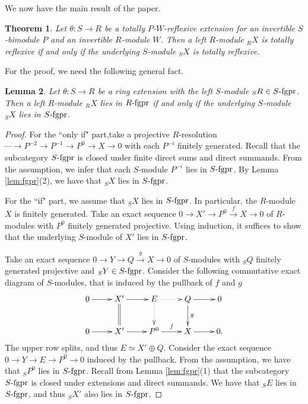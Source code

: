 \documentclass[a4paper]{amsart}
\newtheorem{thm}{Theorem}[section]
\newtheorem{lem}[thm]{Lemma}
\theoremstyle{definition}
\theoremstyle{remark}
\numberwithin{equation}{section}
\begin{document}
We now have the main result of the paper.

\begin{thm}\label{thm:1}
Let $\theta\colon S\rightarrow R$ be a totally $P$-$W$-reflexive extension for  an invertible $S$-bimodule $P$ and an invertible $R$-module $W$. Then a left $R$-module $_RX$ is totally reflexive if and only if the underlying $S$-module $_SX$ is totally reflexive.
\end{thm}

For the proof, we need the following general fact.

\begin{lem}\label{lem:fgpr2}
Let $\theta\colon S\rightarrow R$ be a ring extension with the left $S$-module $_SR\in S\mbox{-{\rm fgpr}}$. Then a left $R$-module $_RX$ lies in $R\mbox{-{\rm fgpr}}$ if and only if the underlying $S$-module $_SX$ lies in $S\mbox{-{\rm fgpr}}$.
\end{lem}

\begin{proof}
For the ``only if" part,take a projective $R$-resolution $\cdots \rightarrow P^{-2}\rightarrow P^{-1}\rightarrow P^0\rightarrow X\rightarrow 0$ with each $P^{-i}$ finitely generated. Recall that the subcategory $S\mbox{-{\rm fgpr}}$ is closed under finite direct sums and direct summands. From the assumption, we infer that each  $S$-module $P^{-i}$ lies in $S\mbox{-{\rm fgpr}}$. By Lemma \ref{lem:fgpr}(2), we have that  $_SX$ lies in $S\mbox{-{\rm fgpr}}$.

For the ``if" part, we assume that $_SX$ lies in $S\mbox{-{\rm fgpr}}$. In particular, the $R$-module $X$ is finitely generated.
Take an exact sequence $0\rightarrow X'\rightarrow P^0\stackrel{f}\rightarrow X\rightarrow 0$ of $R$-modules with $P^0$ finitely generated projective. Using induction, it suffices to show that the underlying $S$-module of $X'$ lies in $S\mbox{-{\rm fgpr}}$.

Take an exact sequence $0\rightarrow Y\rightarrow Q \stackrel{g}\rightarrow X\rightarrow 0$ of $S$-modules with $_SQ$ finitely generated projective and $_SY\in S\mbox{-{\rm fgpr}}$. Consider the following commutative exact diagram of $S$-modules, that is induced by the pullback of $f$ and $g$
\[\xymatrix{
0\ar[r] & X'\ar@{=}[d] \ar[r] &  E\ar@{.>}[r] \ar@{.>}[d] & Q\ar[d]^-{g} \ar[r] & 0\\
0\ar[r] & X' \ar[r] &  P^0\ar[r]^-{f} &  X \ar[r] & 0.
}\]
The upper row splits, and thus $E\simeq X'\oplus Q$. Consider the exact sequence $0\rightarrow Y\rightarrow E\rightarrow P^0\rightarrow 0$ induced by the pullback. From the assumption, we have that $_SP^0$ lies in $S\mbox{-{\rm fgpr}}$. Recall from Lemma \ref{lem:fgpr}(1) that  the subcategory $S\mbox{-{\rm fgpr}}$ is closed under extensions and direct summands.  We have that $_SE$ lies in $S\mbox{-{\rm fgpr}}$, and thus $_SX'$ also lies in $S\mbox{-{\rm fgpr}}$.
\end{proof}
\end{document}
